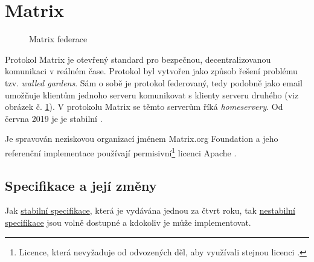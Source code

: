 \section{Matrix}\label{matrix}

\begin{figure}[h]
    \centering
    \caption{Matrix federace}
    \label{federation}
\end{figure}

Protokol Matrix je otevřený standard pro bezpečnou, decentralizovanou komunikaci
v reálném čase. Protokol byl vytvořen jako způsob řešení problému tzv.
\textit{walled gardens}. Sám o sobě je protokol federovaný, tedy podobně jako
email umožňuje klientům jednoho serveru komunikovat s klienty serveru druhého
(viz obrázek č. \ref{federation}). V protokolu Matrix se těmto serverům říká
\textit{homeservery}. Od června 2019 je je stabilní
\parencite{MatrixORG-FAQ,MatrixORG-Homepage}.

Je spravován neziskovou organizací jménem Matrix.org Foundation a jeho
referenční implementace používají permisivní\footnote{Licence, která nevyžaduje
    od odvozených děl, aby využívali stejnou licenci
    \parencite{MUNI-FI-VerejneLicenceVCR}.} licenci Apache \parencite{MatrixORG-Homepage}.

\subsection{Specifikace a její změny}\label{spec}

Jak \href{https://spec.matrix.org/latest/}{stabilní specifikace}, která je
vydávána jednou za čtvrt roku, tak
\href{https://spec.matrix.org/unstable/}{nestabilní specifikace} jsou volně
dostupné a kdokoliv je může implementovat.

